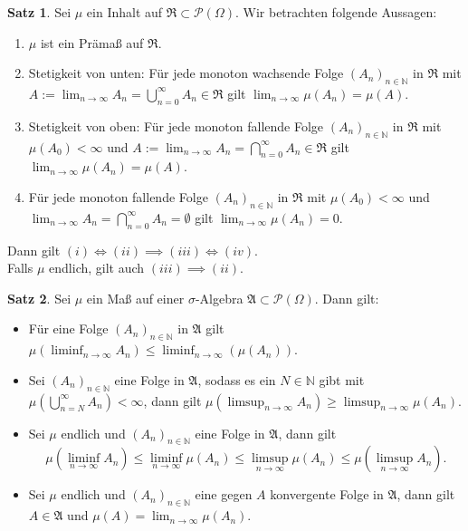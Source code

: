 \documentclass[a4paper,10pt,landscape]{article}
\newcommand{\N}{\mathbb{N}}
\newcommand{\PS}{\mathcal{P}} %
\newcommand{\PSO}{\PS(\Omega)} %
\newcommand{\Alg}{\mathfrak{A}}
\newcommand{\Ring}{\mathfrak{R}}
\theoremstyle{definition}
\newtheorem*{satz}{Satz}
\theoremstyle{remark}
\begin{document}
\begin{multicols}{3}
\begin{satz}
  Sei $\mu$ ein Inhalt auf $\Ring \subset \PSO$. Wir betrachten folgende Aussagen:

  \begin{enumerate}[label=(\roman*),leftmargin=2em]
    \item $\mu$ ist ein Prämaß auf $\Ring$.
    \item Stetigkeit von unten: Für jede monoton wachsende Folge $(A_n)_{n \in \N}$ in $\Ring$ mit $A := \lim_{n \to \infty} A_n = \bigcup_{n = 0}^\infty A_n \in \Ring$ gilt $\lim_{n \to \infty} \mu(A_n) = \mu(A)$.
    \item Stetigkeit von oben: Für jede monoton fallende Folge $(A_n)_{n \in \N}$ in $\Ring$ mit $\mu(A_0) < \infty$ und $A := \lim_{n \to \infty} A_n = \bigcap_{n = 0}^\infty A_n \in \Ring$ gilt $\lim_{n \to \infty} \mu(A_n) = \mu(A)$.
    \item Für jede monoton fallende Folge $(A_n)_{n \in \N}$ in $\Ring$ mit $\mu(A_0) < \infty$ und $\lim_{n \to \infty} A_n = \bigcap_{n = 0}^\infty A_n = \emptyset$ gilt $\lim_{n \to \infty} \mu(A_n) = 0$.
  \end{enumerate}

  Dann gilt $(i) \iff (ii) \implies (iii) \iff (iv)$.\\
  Falls $\mu$ endlich, gilt auch $(iii) \implies (ii)$.
\end{satz}

\begin{satz}
  Sei $\mu$ ein Maß auf einer $\sigma$-Algebra $\Alg \subset \PSO$. Dann gilt:
  \begin{itemize}
    \item Für eine Folge $(A_n)_{n \in \N}$ in $\Alg$ gilt $\mu\left(\liminf_{n \to \infty} A_n\right) \leq \liminf_{n \to \infty}(\mu(A_n))$.
    \item Sei $(A_n)_{n \in \N}$ eine Folge in $\Alg$, sodass es ein $N \in \N$ gibt mit $\mu\left(\bigcup_{n = N}^\infty A_n \right) < \infty$, dann gilt $\mu\left(\limsup_{n \to \infty} A_n \right) \geq \limsup_{n \to \infty} \mu(A_n)$.
    \item Sei $\mu$ endlich und $(A_n)_{n \in \N}$ eine Folge in $\Alg$, dann gilt
    \[ \mu\left(\liminf_{n \to \infty} A_n\right) \leq \liminf_{n \to \infty} \mu(A_n) \leq \limsup_{n \to \infty} \mu(A_n) \leq \mu\left(\limsup_{n \to \infty} A_n\right). \]
    \item Sei $\mu$ endlich und $(A_n)_{n \in \N}$ eine gegen $A$ konvergente Folge in $\Alg$, dann gilt $A \in \Alg$ und $\mu(A) = \lim_{n \to \infty} \mu(A_n)$.
  \end{itemize}
\end{satz}

\end{multicols}
\end{document}
